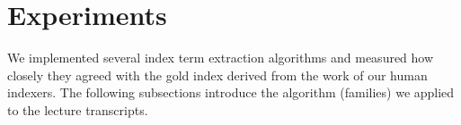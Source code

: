 \section{Experiments}
\label{sec:exp}



We implemented several index term extraction algorithms and measured
how closely they agreed with the gold index derived from the work of
our human indexers. The following subsections introduce the algorithm (families) we
applied to the lecture transcripts.




